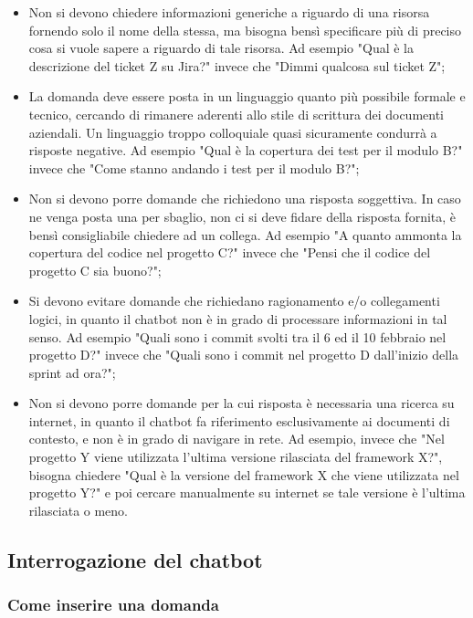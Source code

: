 \begin{itemize}
    \item Non si devono chiedere informazioni generiche a riguardo di una risorsa fornendo solo il nome della stessa, ma bisogna
    bensì specificare più di preciso cosa si vuole sapere a riguardo di tale risorsa. Ad esempio "Qual è la descrizione del ticket
    Z su Jira?" invece che "Dimmi qualcosa sul ticket Z";
    \item La domanda deve essere posta in un linguaggio quanto più possibile formale e tecnico, cercando di rimanere aderenti
    allo stile di scrittura dei documenti aziendali. Un linguaggio troppo colloquiale quasi sicuramente condurrà a risposte negative.
    Ad esempio "Qual è la copertura dei test per il modulo B?" invece che "Come stanno andando i test per il modulo B?";
    \item Non si devono porre domande che richiedono una risposta soggettiva. In caso ne venga posta una per sbaglio, non ci si deve
    fidare della risposta fornita, è bensì consigliabile chiedere ad un collega. Ad esempio "A quanto ammonta la copertura del codice
    nel progetto C?" invece che "Pensi che il codice del progetto C sia buono?";
    \item Si devono evitare domande che richiedano ragionamento e/o collegamenti logici, in quanto il chatbot non è in grado di
    processare informazioni in tal senso. Ad esempio "Quali sono i commit svolti tra il 6 ed il 10 febbraio nel progetto D?" invece che "Quali sono i
    commit nel progetto D dall'inizio della sprint ad ora?";
    \item Non si devono porre domande per la cui risposta è necessaria una ricerca su internet, in quanto il chatbot fa
    riferimento esclusivamente ai documenti di contesto, e non è in grado di navigare in rete. Ad esempio, invece che "Nel
    progetto Y viene utilizzata l'ultima versione rilasciata del framework X?", bisogna chiedere "Qual è la versione del framework X
    che viene utilizzata nel progetto Y?" e poi cercare manualmente su internet se tale versione è l'ultima rilasciata o meno.
\end{itemize}


\subsection{Interrogazione del chatbot}

\subsubsection{Come inserire una domanda}


